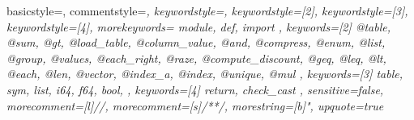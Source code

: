 \newcommand{\refSec}[1]{Sec.~\ref{#1}}
\newcommand{\refFig}[1]{Fig.~\ref{#1}}
\newcommand{\refTable}[1]{Table~\ref{#1}}
\newcommand{\refListing}[1]{Listing~\ref{#1}}
\newcommand{\refAlgo}[1]{Algo.~\ref{#1}}
\newcommand{\refFoot}[1]{\footnote{\footnotesize{#1}}}

\usepackage{textcomp} %
{ basicstyle=\footnotesize\ttfamily,
  commentstyle=\color{Grey}\rmfamily\itshape,
  keywordstyle=\color{SlightPink},
  keywordstyle=[2]\color{NiceBlue},
  keywordstyle=[3]\color{NiceRed},
  keywordstyle=[4]\color{SlightRed},
  morekeywords={
  module,
  def,
  import
  },
  keywords=[2]{
  @table,
  @sum,
  @gt,
  @load_table,
  @column_value,
  @and,
  @compress,
  @enum,
  @list,
  @group,
  @values,
  @each_right,
  @raze,
  @compute_discount,
  @geq,
  @leq,
  @lt,
  @each,
  @len,
  @vector,
  @index_a,
  @index,
  @unique,
  @mul
  },
  keywords=[3]{
  table,
  sym,
  list,
  i64,
  f64,
  bool,
  },
  keywords=[4]{
  return,
  check_cast
  },
  sensitive=false, %
  morecomment=[l]{//}, %
  morecomment=[s]{/*}{*/}, %
  morestring=[b]", %
  upquote=true %
}

\usepackage{balance} %




